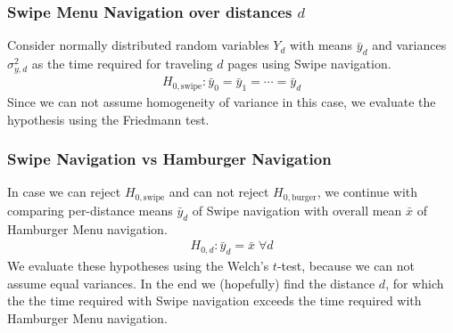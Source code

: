 \documentclass{beamer}
\begin{document}
\begin{frame}
        \frametitle{Swipe Menu Navigation over distances $d$}
        Consider normally
        distributed random variables $Y_d$ with means $\bar y_d$ and variances $\sigma_{y,d}^2$ as the
        time required for traveling $d$ pages using Swipe navigation. 
        \begin{align*}
                H_{0, \text{swipe}}: \bar y_0 = \bar y_1= \cdots = \bar y_d
        \end{align*}
        Since we can not assume homogeneity of variance in this case,
        we evaluate the hypothesis using the Friedmann test. 
\end{frame}

\begin{frame}
        \frametitle{Swipe Navigation vs Hamburger Navigation}
        In case we can reject $H_{0, \text{swipe}}$ and can not reject $H_{0, \text{burger}}$,
        we continue with comparing per-distance means $\bar y_d$ of Swipe navigation
        with overall mean $\bar x$ of Hamburger Menu navigation.
        \begin{align*}
                H_{0,d} : \bar y_d = \bar x \;\forall d
        \end{align*}
        We evaluate these hypotheses using the Welch's $t$-test,
        because we can not assume equal variances.
        In the end we (hopefully) find the distance $d$,
        for which the the time required with Swipe navigation exceeds the time required with Hamburger Menu navigation.
\end{frame}
\end{document}
